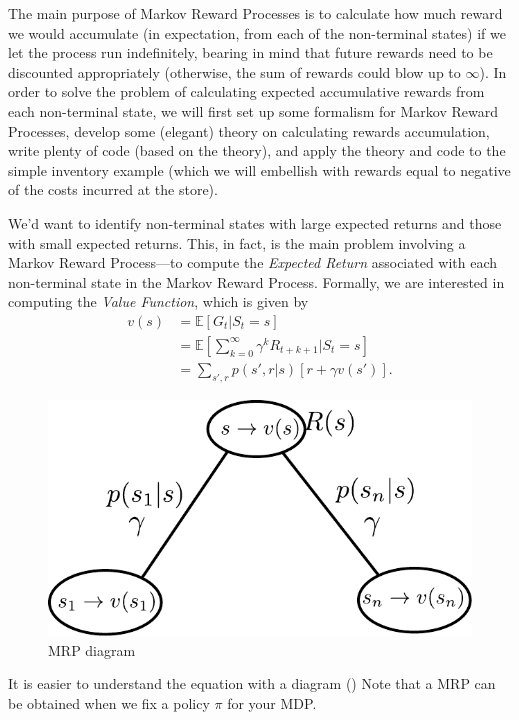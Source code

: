 The main purpose of Markov Reward Processes is to calculate how much reward we would accumulate (in expectation, from each of the non-terminal states) if we let the process run indefinitely, bearing in mind that future rewards need to be discounted appropriately (otherwise, the sum of rewards could blow up to $\infty$). In order to solve the problem of calculating expected accumulative rewards from each non-terminal state, we will first set up some formalism for Markov Reward Processes, develop some (elegant) theory on calculating rewards accumulation, write plenty of code (based on the theory), and apply the theory and code to the simple inventory example (which we will embellish with rewards equal to negative of the costs incurred at the store).


We'd want to identify non-terminal states with large expected returns and those with small expected returns. This, in fact, is the main problem involving a Markov Reward Process—to compute the \textit{Expected Return} associated with each non-terminal state in the Markov Reward Process. Formally, we are interested in computing the \textit{Value Function}, which is given by
\begin{align*}
	v(s)&=\mathbb{E}[G_t|S_t=s]\\
		&=\mathbb{E}\left[\sum_{k=0}^\infty \gamma^kR_{t+k+1}|S_t=s\right]\\
		&= \sum_{s',r}p(s',r|s)[r+\gamma v(s')].
\end{align*} 

\begin{figure}[t]
	\centering
	\includegraphics[scale=0.6]{./images/mrp.pdf}
	\caption{MRP diagram}
	\label{fig:mrp_diagram}
\end{figure}
It is easier to understand the equation with a diagram (\cf {})
Note that a MRP can be obtained when we fix a policy $\pi$ for your MDP. 

